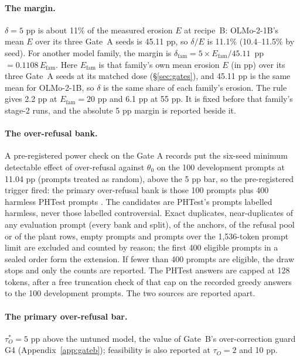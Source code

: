 \documentclass{article}
\theoremstyle{plain}
\theoremstyle{definition}
\theoremstyle{remark}
\begin{document}
\paragraph{The margin.}
$\delta = 5$ pp is about 11\% of the measured erosion $E$ at recipe~B:
OLMo-2-1B's mean $E$ over its three Gate~A seeds is 45.11 pp, so $\delta/E$ is
11.1\% (10.4--11.5\% by seed). For another model family, the margin is
$\delta_{\mathrm{fam}} = 5 \times E_{\mathrm{fam}} / 45.11$~pp $= 0.1108\,
E_{\mathrm{fam}}$. Here $E_{\mathrm{fam}}$ is that family's own mean erosion
$E$ (in pp) over its three Gate~A seeds at its matched dose
(\S\ref{sec:gates}), and 45.11 pp is the same mean for OLMo-2-1B, so $\delta$
is the same share of each family's erosion. The rule gives 2.2 pp at
$E_{\mathrm{fam}} = 20$ pp and 6.1 pp at 55 pp. It is fixed before that
family's stage-2 runs, and the absolute 5 pp margin is reported beside it.

\paragraph{The over-refusal bank.}
A pre-registered power check on the Gate A records put the six-seed minimum
detectable effect of over-refusal against $\theta_0$ on the 100 development
prompts at 11.04 pp (prompts treated as random), above the 5 pp bar, so the
pre-registered trigger fired: the primary over-refusal bank is those 100
prompts plus 400 harmless PHTest prompts \citep{an2024phtest}. The candidates
are PHTest's prompts labelled harmless, never those labelled controversial.
Exact duplicates, near-duplicates of any evaluation prompt (every bank and
split), of the anchors, of the refusal pool or of the plant rows, empty
prompts and prompts over the 1,536-token prompt limit are excluded and counted
by reason; 
the first 400 eligible prompts in a sealed order form the extension. If fewer
than 400 prompts are eligible, the draw stops and only the counts are
reported. The PHTest answers are capped at 128 tokens, after a free truncation
check of that cap on the recorded greedy answers to the 100 development
prompts. The two sources are reported apart.

\paragraph{The primary over-refusal bar.}
$\tau_O^* = 5$ pp above the untuned model, the value of Gate~B's
over-correction guard G4 (Appendix~\ref{app:gateb}); feasibility is also
reported at $\tau_O = 2$ and 10 pp.
\end{document}
